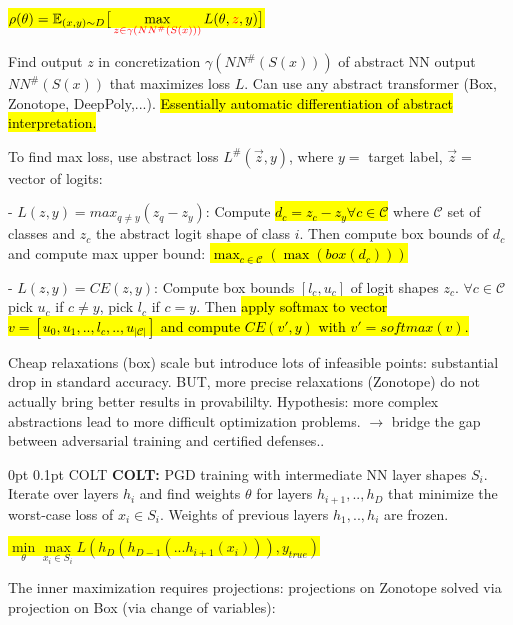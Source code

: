 \documentclass[11pt,landscape,a4paper,fleqn]{article}
\makeatletter
\renewcommand{\subsection}{\@startsection{subsection}{1}{0mm}%
                                {0pt}%
                                {0.1pt}%
                            	{\color{myorange2}\sffamily\small}}
\newcommand{\mhl}[1]{\setlength{\fboxsep}{0pt}\colorbox{yellow}{#1}}
\makeatother
\begin{document}
\begin{multicols*}{4}
\mhl{$\rho(\theta) = \mathbb{E}_{(x,y) \sim D} \big[ \max\limits_{\textcolor{red}{z \in \gamma(NN^\#(S(x)))}} L(\theta, \textcolor{red}{z}, y) \big]$}

Find output $z$ in concretization $\gamma(NN^\#(S(x)))$ of abstract NN output $NN^\#(S(x))$ that maximizes loss $L$. Can use any abstract transformer (Box, Zonotope, DeepPoly,...). \hl{Essentially automatic differentiation of abstract interpretation.}

To find max loss, use abstract loss $L^\#(\vec{z}, y)$, where $y = $ target label, $\vec{z} = $ vector of logits:
\vspace*{1mm}

- $L(z, y) = max_{q \neq y} (z_q - z_y)$: Compute \hl{$d_c = z_c - z_y \forall c \in \mathcal{C}$} where $\mathcal{C}$ set of classes and $z_c$ the abstract logit shape of class $i$. Then compute box bounds of $d_c$ and compute max upper bound: \hl{$\max_{c \in \mathcal{C}}(\max(box(d_c)))$}

- $L(z,y) = CE(z,y)$: Compute box bounds $[l_c, u_c]$ of logit shapes $z_c$. $\forall c \in \mathcal{C}$ pick $u_c$ if $c \neq y$, pick $l_c$ if $c = y$. Then \hl{apply softmax to vector $v = [u_0, u_1,.., l_c,.., u_{|\mathcal{C}|}]$ and compute $CE(v', y)$ with $v' = softmax(v)$.}

Cheap relaxations (box) scale but introduce lots of infeasible points: substantial drop in standard accuracy.
BUT, more precise relaxations (Zonotope) do not actually bring better results in provabililty. Hypothesis: more complex abstractions lead to more difficult optimization problems. $\rightarrow$ bridge the gap between adversarial training and certified defenses..
\vspace*{2mm}

\subsection{COLT}
\textbf{COLT:} PGD training with intermediate NN layer shapes $S_i$. Iterate over layers $h_i$ and find weights $\theta$ for layers $h_{i+1},..,h_D$ that minimize the worst-case loss of $x_i \in S_i$. Weights of previous layers $h_1,..,h_{i}$ are frozen.

\colorbox{yellow}{$\min\limits_\theta \max\limits_{x_i \in S_i} L(h_D(h_{D-1}(... h_{i+1}(x_i))), y_{true})$}

The inner maximization requires projections: projections on Zonotope solved via projection on Box (via change of variables):


\end{multicols*}
\end{document}
